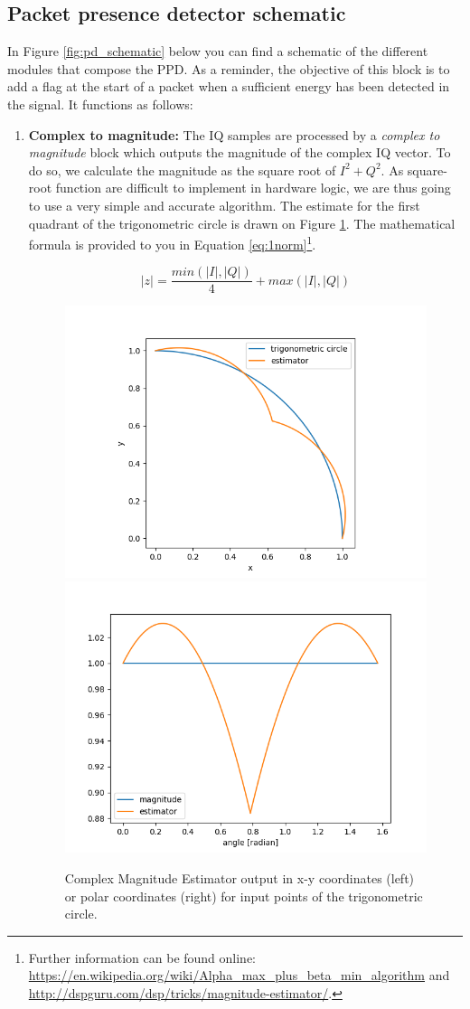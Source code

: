 \subsection{Packet presence detector schematic}
In Figure \ref{fig:pd_schematic} below you can find a schematic of the different modules that compose the PPD. As a reminder, the objective of this block is to add a flag at the start of a packet when a sufficient energy has been detected in the signal. It functions as follows:
\begin{enumerate}
    \item \textbf{Complex to magnitude: } The IQ samples are processed by a \textit{complex to magnitude} block which outputs the magnitude of the complex IQ vector.
    To do so, we calculate the magnitude as the square root of $I^2+Q^2$. As square-root function are difficult to implement in hardware logic, we are thus going to use a very simple and accurate algorithm. The estimate for the first quadrant of the trigonometric circle is drawn on Figure \ref{fig:cmplx2mag}. The mathematical formula is provided to you in Equation \ref{eq:1norm}\footnote{Further information can be found online: \url{https://en.wikipedia.org/wiki/Alpha_max_plus_beta_min_algorithm} and \url{http://dspguru.com/dsp/tricks/magnitude-estimator/}.}.

    \begin{equation}
        |z| = \frac{min(|I|,|Q|)}{4} + max(|I|,|Q|)
        \label{eq:1norm}
    \end{equation}

    \begin{figure}[h]
        \centering
        \includegraphics[width=0.45\linewidth]{figures/trigo.png}
        \includegraphics[width=0.45\linewidth]{figures/angle.png}
        \caption{Complex Magnitude Estimator output in x-y coordinates (left) or polar coordinates (right) for input points of the trigonometric circle.}
        \label{fig:cmplx2mag}
    \end{figure}


\end{enumerate}
